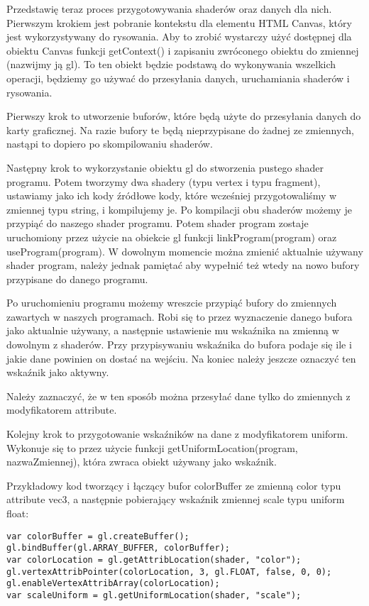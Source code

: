 Przedstawię teraz proces przygotowywania shaderów oraz danych dla nich. Pierwszym krokiem jest pobranie kontekstu dla elementu HTML Canvas, który jest wykorzystywany do rysowania. Aby to zrobić wystarczy użyć dostępnej dla obiektu Canvas funkcji getContext() i zapisaniu zwróconego obiektu do zmiennej (nazwijmy ją gl). To ten obiekt będzie podstawą do wykonywania wszelkich operacji, będziemy go używać do przesyłania danych, uruchamiania shaderów i rysowania.

Pierwszy krok to utworzenie buforów, które będą użyte do przesyłania danych do karty graficznej. Na razie bufory te będą nieprzypisane do żadnej ze zmiennych, nastąpi to dopiero po skompilowaniu shaderów.

Następny krok to wykorzystanie obiektu gl do stworzenia pustego shader programu. Potem tworzymy dwa shadery (typu vertex i typu fragment), ustawiamy jako ich kody źródłowe kody, które wcze\'sniej przygotowali\'smy w zmiennej typu string, i kompilujemy je. Po kompilacji obu shaderów możemy je przypiąć do naszego shader programu. Potem shader program zostaje uruchomiony przez użycie na obiekcie gl funkcji linkProgram(program) oraz useProgram(program). W dowolnym momencie można zmienić aktualnie używany shader program, należy jednak pamiętać aby wypełnić też wtedy na nowo bufory przypisane do danego programu.

Po uruchomieniu programu możemy wreszcie przypiąć bufory do zmiennych zawartych w naszych programach. Robi się to przez wyznaczenie danego bufora jako aktualnie używany, a następnie ustawienie mu wskaźnika na zmienną w dowolnym z shaderów. Przy przypisywaniu wskaźnika do bufora podaje się ile i jakie dane powinien on dostać na wej\'sciu. Na koniec należy jeszcze oznaczyć ten wskaźnik jako aktywny.

Należy zaznaczyć, że w ten sposób można przesyłać dane tylko do zmiennych z modyfikatorem attribute.

Kolejny krok to przygotowanie wskaźników na dane z modyfikatorem uniform. Wykonuje się to przez użycie funkcji getUniformLocation(program, nazwaZmiennej), która zwraca obiekt używany jako wskaźnik.

\noindent Przykładowy kod tworzący i łączący bufor colorBuffer ze zmienną color typu attribute vec3, a następnie pobierający wskaźnik zmiennej scale typu uniform float:
\begin{lstlisting}
var colorBuffer = gl.createBuffer();
gl.bindBuffer(gl.ARRAY_BUFFER, colorBuffer);
var colorLocation = gl.getAttribLocation(shader, "color");
gl.vertexAttribPointer(colorLocation, 3, gl.FLOAT, false, 0, 0);
gl.enableVertexAttribArray(colorLocation);
var scaleUniform = gl.getUniformLocation(shader, "scale");
\end{lstlisting}

